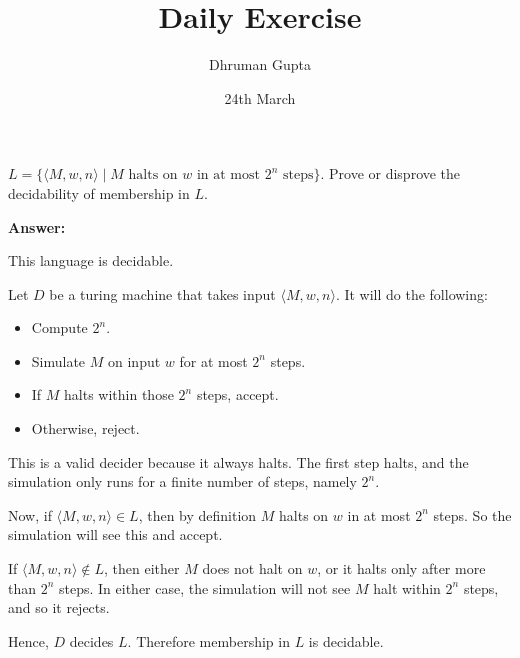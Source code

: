 \documentclass[11pt]{article}
\title{Daily Exercise}
\author{Dhruman Gupta}
\date{24th March}
\begin{document}

$L = \{\langle M,w,n\rangle \mid M \text{ halts on } w \text{ in at most } 2^n \text{ steps}\}$. Prove or disprove the decidability of membership in $L$.

\textbf{Answer:}

This language is decidable.

Let $D$ be a turing machine that takes input $\langle M,w,n\rangle$. It will do the following:

\begin{itemize}
    \item Compute $2^n$.
    \item Simulate $M$ on input $w$ for at most $2^n$ steps.
    \item If $M$ halts within those $2^n$ steps, accept.
    \item Otherwise, reject.
\end{itemize}

This is a valid decider because it always halts. The first step halts, and the simulation only runs for a finite number of steps, namely $2^n$.

Now, if $\langle M,w,n\rangle \in L$, then by definition $M$ halts on $w$ in at most $2^n$ steps. So the simulation will see this and accept.

If $\langle M,w,n\rangle \notin L$, then either $M$ does not halt on $w$, or it halts only after more than $2^n$ steps. In either case, the simulation will not see $M$ halt within $2^n$ steps, and so it rejects.

Hence, $D$ decides $L$. Therefore membership in $L$ is decidable.
\end{document}
